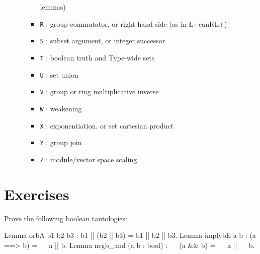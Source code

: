 \begin{itemize}
\begin{itemize}
\begin{itemize}
      lemmas)
    \item {\tt R} : group commutator, or right hand side (as in
      \L+canRL+)
    \item {\tt S} : subset argument, or integer successor
    \item {\tt T} : boolean truth and Type-wide sets
    \item {\tt U} : set union
    \item {\tt V} : group or ring multiplicative inverse
    \item {\tt W} : weakening
    \item {\tt X} : exponentiation, or set cartesian product
    \item {\tt Y} : group join
    \item {\tt Z} : module/vector space scaling
    \end{itemize}
  \end{itemize}
\end{itemize}


%
%


\newpage
\section{Exercises}

\begin{Exercise}[label=ex:boolid,difficulty=0,title={Truth tables}]

Prove the following boolean tautologies:

\begin{coq}{}{}
Lemma orbA b1 b2 b3 : b1 || (b2 || b3) = b1 || b2 || b3.
Lemma implybE a b : (a ==> b) = ~~ a || b.
Lemma negb_and (a b : bool) : ~~ (a && b) = ~~ a || ~~ b.
\end{coq}

\end{Exercise}

